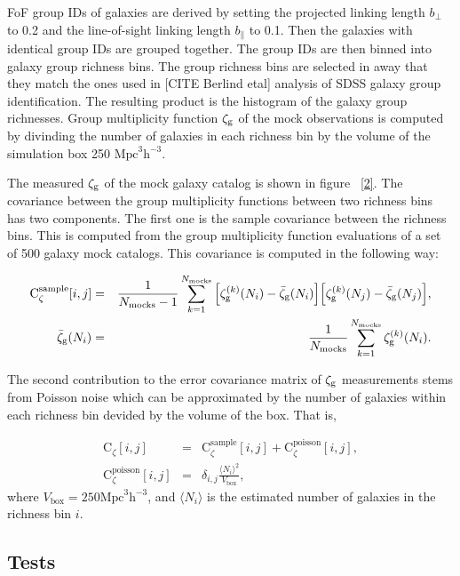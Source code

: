 \documentclass[12pt, preprint]{aastex}
\begin{document}
FoF group IDs of galaxies are derived by setting the projected linking length $b_{\perp}$ to 0.2 and the line-of-sight linking length $b_{\parallel}$ to 0.1. Then the galaxies with identical group IDs are grouped together. The group IDs are then binned into galaxy group richness bins. The group richness bins are selected in away that they match the ones used in [CITE Berlind etal] analysis of SDSS galaxy group identification. The resulting product is the histogram of the galaxy group richnesses. Group multiplicity function $\mathcal{\zeta}_{\rm g}$ of the mock observations is computed by divinding the number of galaxies in each richness bin by the volume of the simulation box 250 $\mathrm{Mpc}^3\mathrm{h}^{-3}$.

The measured $\mathcal{\zeta}_{\rm g}$ of the mock galaxy catalog is shown in figure ~\ref{2}. The covariance between the group multiplicity functions between two richness bins has two components. The first one is the sample covariance between the richness bins. This is computed from the group multiplicity function evaluations of a set of 500 galaxy mock catalogs. This covariance is computed in the following way:

\begin{eqnarray} 
\mathrm{C}_{\zeta}^{\mathrm{sample}}[i,j] &=& \frac{1}{N_{\mathrm{mocks}}-1}\sum_{k=1}^{N_{\mathrm{mocks}}} \Big[\mathcal{\zeta}_{\rm g}^{(k)}(N_{i})-\bar{\zeta}_{\rm g}(N_{i})\Big]\Big[\mathcal{\zeta}_{\rm g}^{(k)}(N_{j})-\bar{\zeta}_{\rm g}(N_{j}) \Big], \\
\bar{\zeta}_{\rm g}(N_{i}) &=& \frac{1}{N_{\mathrm{mocks}}}\sum_{k=1}^{N_{\mathrm{mocks}}} \mathcal{\zeta}_{\rm g}^{(k)}(N_{i}).
\end{eqnarray}

The second contribution to the error covariance matrix of $\mathcal{\zeta}_{\rm g}$ measurements stems from Poisson noise which can be approximated by the number of galaxies within each richness bin devided by the volume of the box. That is,

\begin{eqnarray} 
\mathrm{C}_{\zeta}[i,j] &=& \mathrm{C}_{\zeta}^{\mathrm{sample}}[i,j] + \mathrm{C}_{\zeta}^{\mathrm{poisson}}[i,j], \\
\mathrm{C}_{\zeta}^{\mathrm{poisson}}[i,j] &=& \delta_{i,j}\frac{\langle N_{i}\rangle^{2}}{V_{\mathrm{box}}},
\end{eqnarray}
where $V_{\mathrm{box}} = 250 \mathrm{Mpc}^3\mathrm{h}^{-3}$, and $\langle N_{i}\rangle$ is the estimated number of galaxies in the richness bin $i$.

\subsection{Tests}
\end{document}
